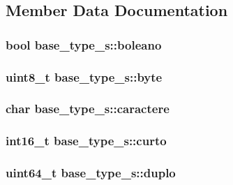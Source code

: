 \subsection{Member Data Documentation}
\hypertarget{unionbase__type__s_a67bd49b04a984ad96792e5b22c8a1cf3}{
\subsubsection[{boleano}]{\setlength{\rightskip}{0pt plus 5cm}bool base\+\_\+type\+\_\+s\+::boleano}}\label{unionbase__type__s_a67bd49b04a984ad96792e5b22c8a1cf3}
\hypertarget{unionbase__type__s_a0764f45a4f066274e13342daba99a1a9}{
\subsubsection[{byte}]{\setlength{\rightskip}{0pt plus 5cm}uint8\+\_\+t base\+\_\+type\+\_\+s\+::byte}}\label{unionbase__type__s_a0764f45a4f066274e13342daba99a1a9}
\hypertarget{unionbase__type__s_ae87ff5b2ecc7de22ab4012a8c4ee71b7}{
\subsubsection[{caractere}]{\setlength{\rightskip}{0pt plus 5cm}char base\+\_\+type\+\_\+s\+::caractere}}\label{unionbase__type__s_ae87ff5b2ecc7de22ab4012a8c4ee71b7}
\hypertarget{unionbase__type__s_a210f8a1effde127c16d34dd8d45f64e6}{
\subsubsection[{curto}]{\setlength{\rightskip}{0pt plus 5cm}int16\+\_\+t base\+\_\+type\+\_\+s\+::curto}}\label{unionbase__type__s_a210f8a1effde127c16d34dd8d45f64e6}
\hypertarget{unionbase__type__s_ad688d9e96a528dd0e80f39dbbfab695f}{
\subsubsection[{duplo}]{\setlength{\rightskip}{0pt plus 5cm}uint64\+\_\+t base\+\_\+type\+\_\+s\+::duplo}}\label{unionbase__type__s_ad688d9e96a528dd0e80f39dbbfab695f}
